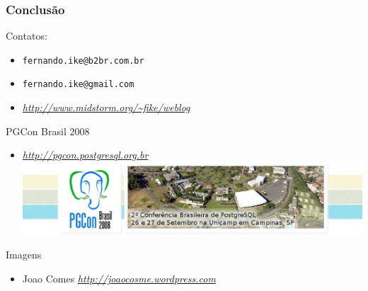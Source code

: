 \documentclass{beamer}
\begin{document}
\begin{frame}
    \frametitle{\textbf{Conclusão}}
    \begin{block}{Contatos:}
        \begin{itemize}
            \item {\texttt{fernando.ike@b2br.com.br}}
            \item {\texttt{fernando.ike@gmail.com}}
            \item {\textit{\url{ http://www.midstorm.org/~fike/weblog}}}
        \end{itemize}
    \end{block}

    \begin{block}{PGCon Brasil 2008}
        \begin{itemize}
            \item {\textit{\url{http://pgcon.postgresql.org.br}}} \\
            \includegraphics[scale=0.2]{images/pgconbr.eps}
        \end{itemize}
    \end{block}

    \begin{block}{Imagens}
        \begin{itemize}
	  \item Joao Comes {\textit{\url{ http://joaocosme.wordpress.com}}}
        \end{itemize}  
    \end{block}


\end{frame}
\end{document}
